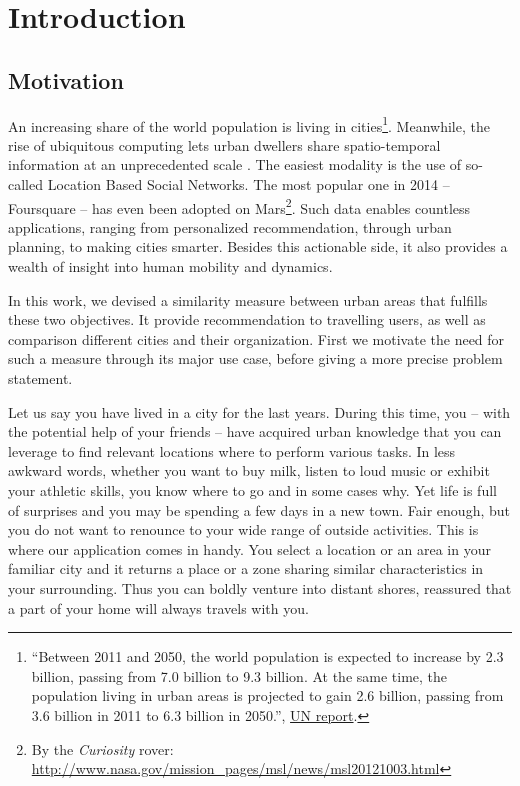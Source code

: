 \chapter{Introduction}
\label{ch:introduction}

\section{Motivation}

An increasing share of the world population is living in
cities\footnote{\enquote{Between 2011 and 2050, the world population is
		expected to increase by 2.3 billion, passing from 7.0 billion
		to 9.3 billion. At the same time, the population living in
urban areas is projected to gain 2.6 billion, passing from 3.6 billion in 2011
to 6.3 billion in 2050.},
\href{http://esa.un.org/unup/pdf/WUP2011_Highlights.pdf}{UN report}.}.
Meanwhile, the rise of ubiquitous computing lets urban dwellers share
spatio-temporal information at an unprecedented scale
\autocite{SpatialComputing12}. The easiest modality is the use of so-called
Location Based Social Networks. The most popular one in 2014 -- Foursquare --
has even been adopted on Mars\footnote{By the \emph{Curiosity} rover:
	\href{http://www.nasa.gov/mission_pages/msl/news/msl20121003.html}%
{http://www.nasa.gov/mission\_pages/msl/news/msl20121003.html}}. Such data enables countless
applications, ranging from personalized recommendation, through urban
planning, to making cities smarter. Besides this actionable side, it also
provides a wealth of insight into human mobility and dynamics.

\medskip

In this work, we devised a similarity measure between urban areas that
fulfills these two objectives. It provide recommendation to travelling users,
as well as comparison different cities and their organization. First we
motivate the need for such a measure through its major use case, before giving
a more precise problem statement.

\medskip

Let us say you have lived in a city for the last years. During this time, you
-- with the potential help of your friends -- have acquired urban knowledge
that you can leverage to find relevant locations where to perform various
tasks. In less awkward words, whether you want to buy milk, listen to loud
music or exhibit your athletic skills, you know where to go and in some cases
why. Yet life is full of surprises and you may be spending a few days in a new
town. Fair enough, but you do not want to renounce to your wide range of
outside activities. This is where our application comes in handy. You select a
location or an area in your familiar city and it returns a place or a zone
sharing similar characteristics in your surrounding. Thus you can boldly
venture into distant shores, reassured that a part of your home will always
travels with you.

